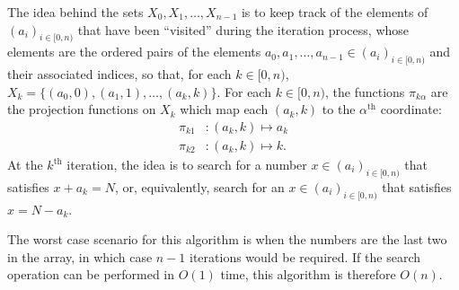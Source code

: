The idea behind the sets $X_0, X_1, \ldots, X_{n - 1}$ is to keep track of the elements of $(a_i)_{i \in [0, n)}$ that have been ``visited'' during the iteration process, whose elements are the ordered pairs of the elements $a_0, a_1, \ldots, a_{n - 1} \in (a_i)_{i \in [0, n)}$ and their associated indices, so that, for each $k \in [0, n)$, $X_k = \{(a_0, 0), (a_1, 1), \ldots, (a_k, k)\}$. For each $k \in [0, n)$, the functions $\pi_{k \alpha}$ are the projection functions on $X_k$ which map each $(a_k, k)$ to the $\alpha^{\text{th}}$ coordinate:
\begin{align*}
  \pi_{k1} &: (a_k, k) \mapsto a_k \\
  \pi_{k2} &: (a_k, k) \mapsto k.
\end{align*}
At the $k^{\text{th}}$ iteration, the idea is to search for a number $x \in (a_i)_{i \in [0, n)}$ that satisfies $x + a_k = N$, or, equivalently, search for an $x \in (a_i)_{i \in [0, n)}$ that satisfies $x = N - a_k$.

The worst case scenario for this algorithm is when the numbers are the last two in the array, in which case $n - 1$ iterations would be required. If the search operation can be performed in $O(1)$ time, this algorithm is therefore $O(n)$.


\clearpage

